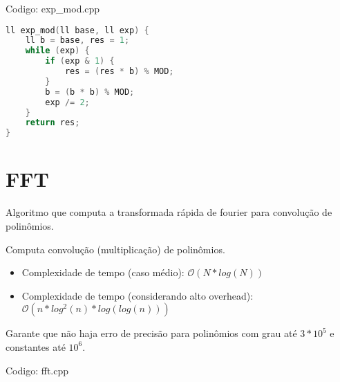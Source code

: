 \documentclass[10pt, a4paper, oneside]{book}
\begin{document}
\hfill

Codigo: exp\_mod.cpp

\begin{lstlisting}[language=C++]
ll exp_mod(ll base, ll exp) {
    ll b = base, res = 1;
    while (exp) {
        if (exp & 1) {
            res = (res * b) % MOD;
        }
        b = (b * b) % MOD;
        exp /= 2;
    }
    return res;
}
\end{lstlisting}
\hfill

\section{FFT}


Algoritmo que computa a transformada rápida de fourier para convolução de polinômios.



Computa convolução (multiplicação) de polinômios.



\begin{itemize}
\item Complexidade de tempo (caso médio): $\mathcal{O}(N * log(N))$
\item Complexidade de tempo (considerando alto overhead): $\mathcal{O}(n * log^2(n) * log(log(n)))$
\end{itemize}



Garante que não haja erro de precisão para polinômios com grau até $3 * 10^5$ e constantes até $10^6$.

\hfill

Codigo: fft.cpp
\end{document}
